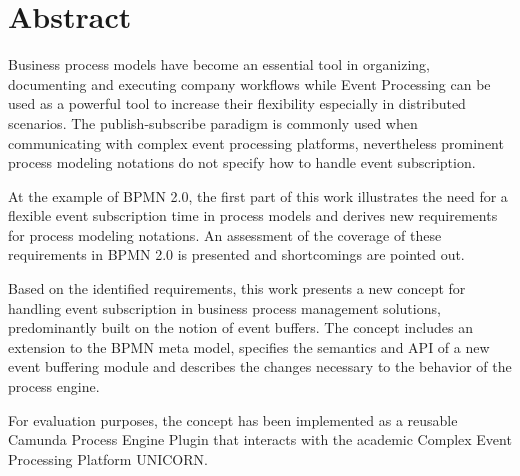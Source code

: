 \begingroup
\let\clearpage\relax
\let\cleardoublepage\relax
\let\cleardoublepage\relax

\chapter*{Abstract}
Business process models have become an essential tool in organizing, documenting and executing company workflows while Event Processing can be used as a powerful tool to increase their flexibility especially in distributed scenarios. 
The publish-subscribe paradigm is commonly used when communicating with complex event processing platforms, nevertheless prominent process modeling notations do not specify how to handle event subscription.

At the example of BPMN 2.0, the first part of this work illustrates the need for a flexible event subscription time in process models and derives new requirements for process modeling notations. An assessment of the coverage of these requirements in BPMN 2.0 is presented and shortcomings are pointed out.

Based on the identified requirements, this work presents a new concept for handling event subscription in business process management solutions, predominantly built on the notion of event buffers. The concept includes an extension to the BPMN meta model, specifies the semantics and API of a new event buffering module and describes the changes necessary to the behavior of the process engine.

For evaluation purposes, the concept has been implemented as a reusable Camunda Process Engine Plugin that interacts with the academic Complex Event Processing Platform UNICORN.

\pagebreak
\vfill



